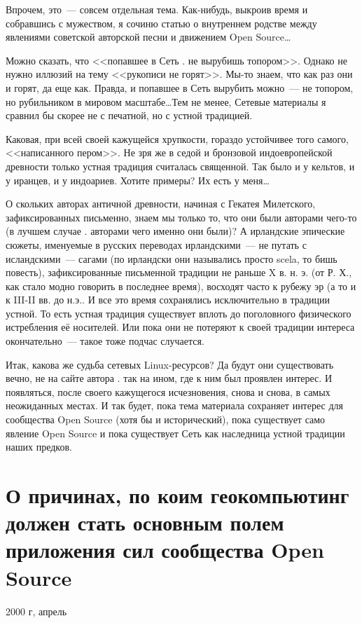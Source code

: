 Впрочем, это~--- совсем отдельная тема. Как-нибудь, выкроив время и собравшись с мужеством, я сочиню статью о внутреннем родстве между явлениями советской авторской песни и движением Open Source\dots 

Можно сказать, что <<попавшее в Сеть . не вырубишь топором>>. Однако не нужно иллюзий на тему <<рукописи не горят>>. Мы-то знаем, что как раз они и горят, да еще как. Правда, и попавшее в Сеть вырубить можно~--- не топором, но рубильником в мировом масштабе\dots Тем не менее, Сетевые материалы я сравнил бы скорее не с печатной, но с устной традицией. 

Каковая, при всей своей кажущейся хрупкости, гораздо устойчивее того самого, <<написанного пером>>. Не зря же в седой и бронзовой индоевропейской древности только устная традиция считалась священной. Так было и у кельтов, и у иранцев, и у индоариев. Хотите примеры? Их есть у меня\dots 

О скольких авторах античной древности, начиная с Гекатея Милетского, зафиксированных письменно, знаем мы только то, что они были авторами чего-то (в лучшем случае . авторами чего именно они были)? А ирландские эпические сюжеты, именуемые в русских переводах ирландскими~--- не путать с исландскими~--- сагами (по ирландски они назывались просто scela, то бишь повесть), зафиксированные письменной традиции не раньше X в. н. э. (от Р. Х., как стало модно говорить в последнее время), восходят часто к рубежу эр (а то и к III-II вв. до н.э.. И все это время сохранялись исключительно в традиции устной. То есть устная традиция существует вплоть до поголовного физического истребления её носителей. Или пока они не потеряют к своей традиции интереса окончательно~--- такое тоже подчас случается. 

Итак, какова же судьба сетевых Linux-ресурсов? Да будут они существовать вечно, не на сайте автора . так на ином, где к ним был проявлен интерес. И появляться, после своего кажущегося исчезновения, снова и снова, в самых неожиданных местах. И так будет, пока тема материала сохраняет интерес для сообщества Open Source (хотя бы и исторический), пока существует само явление Open Source и пока существует Сеть как наследница устной традиции наших предков.

\section{О причинах, по коим геокомпьютинг должен стать основным полем приложения сил сообщества Open Source} 
\begin{timeline}2000 г, апрель\end{timeline}

